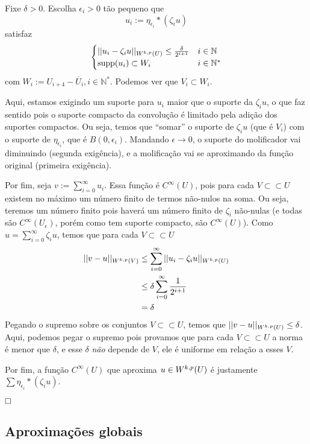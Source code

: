 \documentclass[11pt]{article}
\newcommand{\qed}{$\hfill\square$}
\newcommand{\N}{\mathbb{N}}
\newcommand{\e}{\epsilon}
\begin{document}
Fixe \( \delta>0\). Escolha \( \e_i>0 \) tão pequeno que \[ u_i := \eta_{\e_i} * \left(\zeta_iu\right) \] satisfaz \[ \begin{cases}
	||u_i - \zeta_iu||_{\sobolevdef} \leq \frac{\delta}{2^{i+1}} & i \in \N \\
	\text{supp}(u_i) \subset W_i & i \in \N^*
\end{cases} \] com \( W_i := U_{i+4} - \overline{U}_i, i \in \N^* \). Podemos ver que \( V_i \subset W_i \). 

Aqui, estamos exigindo um suporte para \( u_i \) maior que o suporte da \( \zeta_iu \), o que faz sentido pois o suporte compacto da convolução é limitado pela adição dos suportes compactos. Ou seja, temos que ``somar'' o suporte de \( \zeta_iu \) (que é \( V_i \)) com o suporte de \( \eta_{\e_i} \), que é \( B(0, \e_i) \). Mandando \( \e\rightarrow 0 \), o suporte do molificador vai diminuindo (segunda exigência), e a molificação vai se aproximando da função original (primeira exigência).

Por fim, seja $ v:=\sum_{i=0}^{\infty} u_i $. Essa função é \( C^\infty(U) \), pois para cada \( V \subset\subset U \) existem no máximo um número finito de termos não-nulos na soma. Ou seja, teremos um número finito pois haverá um número finito de \( \zeta_i \) não-nulas (e todas são \( C^\infty (U_\e) \), porém como tem suporte compacto, são \( C^\infty(U) \)). Como \( u=\sum_{i=0}^{\infty}\zeta_iu  \), temos que para cada \( V \subset\subset U \) 
\begin{align*}
	||v - u||_{W^{k,p}(V)} &\leq \sum_{i=0}^{\infty} ||u_i - \zeta_iu||_{W^{k,p}(U)} \\
	&\leq \delta  \sum_{i=0}^{\infty}  \frac{1}{2^{i+1}}\\
	&= \delta
\end{align*} Pegando o supremo sobre os conjuntos \( V \subset\subset U \), temos que \( ||v-u||_{W^{k,p}(U)} \leq \delta \). Aqui, podemos pegar o supremo pois provamos que para cada \( V \subset\subset U \) a norma é menor que \( \delta \), e esse \( \delta \) \textit{não} depende de \( V \), ele é uniforme em relação a esses \( V \).

Por fim, a função \( C^{\infty}(U) \) que aproxima \( u \in W^{k,p}(U) \) é justamente \( \sum \eta_{\e_i} * (\zeta_i u) \).

\qed




\subsection{Aproximações globais}
\end{document}
